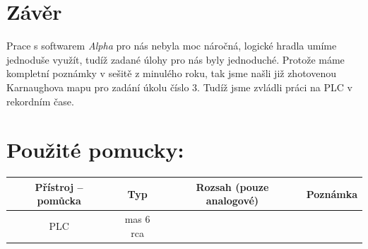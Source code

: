 \documentclass[12pt,a4paper]{article}
\begin{document}
\section*{Závěr}
Prace s softwarem \textit{Alpha} pro nás nebyla moc náročná, logické hradla umíme jednoduše využít, tudíž zadané úlohy pro nás byly jednoduché. Protože máme kompletní poznámky v sešitě z minulého roku, tak jsme našli již zhotovenou Karnaughova mapu pro zadání úkolu číslo 3. Tudíž jsme zvládli práci na PLC v rekordním čase.
\vfill
\section*{Použité pomucky:}
\begin{tabularx}{\linewidth}{c|c|c|c}
	Přístroj – pomůcka & Typ & Rozsah (pouze analogové)
	& Poznámka \\
	\hline
	PLC & mas 6 rca & &
\end{tabularx}
\end{document}

